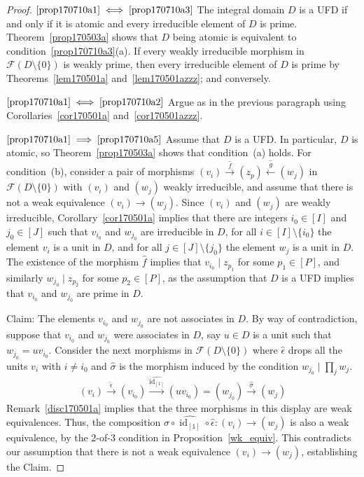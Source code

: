 \documentclass[reqno]{amsart}
\theoremstyle{plain}
\theoremstyle{definition}
\newcommand{\cat}[1]{\mathcal{#1}}
\newcommand{\catf}{\cat{F}}
\newcommand{\id}{\operatorname{id}}
\newcommand{\xra}{\xrightarrow}
\newcommand{\xla}{\xleftarrow}
\numberwithin{equation}{lem}
\begin{document}
\begin{proof}
$\eqref{prop170710a1}\iff\eqref{prop170710a3}$
The 
integral
domain $D$ is a UFD if and only if it is atomic and every irreducible element of $D$ is prime. 
Theorem~\ref{prop170503a} shows that $D$ being atomic is equivalent to 
condition~\eqref{prop170710a3}(a).
If every 
weakly
irreducible morphism in $\catf(D \setminus \{0\})$ is 
weakly
prime, then 
every irreducible element of $D$ is prime by 
Theorems~\ref{lem170501a} and~\ref{lem170501azzz};
and conversely.

$\eqref{prop170710a1}\iff\eqref{prop170710a2}$
Argue as in the previous paragraph using Corollaries~\ref{cor170501a} and~\ref{cor170501azzz}.

$\eqref{prop170710a1}\implies\eqref{prop170710a5}$
Assume that $D$ is a UFD.
In particular, $D$ is atomic, so Theorem~\ref{prop170503a} shows that condition~(a) holds. 
For condition~(b), 
consider a pair of morphisms $(v_i)\xra{\hat f}(z_p)\xla{\hat g}(w_j)$ in $\catf(D\setminus\{0\})$ with $(v_i)$ and $(w_j)$ 
weakly
irreducible,
and assume that there is not a weak equivalence $(v_i)\to(w_j)$.
Since $(v_i)$ and $(w_j)$ are 
weakly
irreducible, Corollary~\ref{cor170501a} implies that there are integers $i_0\in[I]$ and
$j_0\in[J]$ such that $v_{i_0}$ and $w_{j_0}$ are irreducible in $D$, for all $i\in[I]\setminus\{i_0\}$ the element $v_i$ is a unit in $D$,
and for all $j\in[J]\setminus\{j_0\}$ the element $w_j$ is a unit in $D$.
The existence of the morphism $\hat f$ implies that $v_{i_0}\mid z_{p_1}$ for some $p_1\in[P]$,
and similarly $w_{j_0}\mid z_{p_2}$ for some $p_2\in[P]$,
as the assumption that $D$ is a UFD implies that $v_{i_0}$ and $w_{j_0}$ are prime in $D$.

Claim: The elements $v_{i_0}$ and $w_{j_0}$ are not associates in $D$.
By way of contradiction, suppose that $v_{i_0}$ and $w_{j_0}$ were  associates in $D$, 
say $u\in D$ is a unit such that $w_{j_0}=uv_{i_0}$.
Consider the next morphisms  in $\catf(D\setminus\{0\})$
where $\hat\epsilon$ drops all the units $v_i$ with $i\neq i_0$ 
and $\hat\sigma$ is the morphism induced by the condition $w_{j_0}\mid\prod_jw_j$.
$$(v_i)\xra{\hat\epsilon}(v_{i_0})\xra{\widehat{\id_{[1]}}}(uv_{i_0})=(w_{j_0})\xra{\hat\sigma}(w_j)$$
Remark~\ref{disc170501a} implies that the three morphisms in this display are weak equivalences.
Thus, the composition $\hat\sigma\circ\widehat{\id_{[1]}}\circ\hat\epsilon\colon (v_i)\to (w_j)$
is also a weak equivalence, by the 2-of-3 condition 
in Proposition~\ref{wk_equiv}.
This contradicts our assumption that there is not a weak equivalence $(v_i)\to(w_j)$,
establishing the Claim.


\end{proof}
\end{document}
